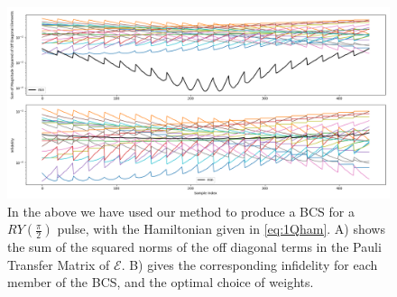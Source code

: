 \documentclass[aps,nofootinbib,pra,notitlepage,twocolumn]{revtex4-1}
\begin{document}
\begin{figure}
\centering
\includegraphics[width=\textwidth]{y2.png}
\caption{In the above we have used our method to produce a BCS for a $RY(\frac{\pi}{2})$ pulse, with the Hamiltonian given in \ref{eq:1Qham}. A) shows the sum of the squared norms of the off diagonal terms in the Pauli Transfer Matrix of $\mathcal{E}$. B) gives the corresponding infidelity for each member of the BCS, and the optimal choice of weights.}
\end{figure}
\end{document}
